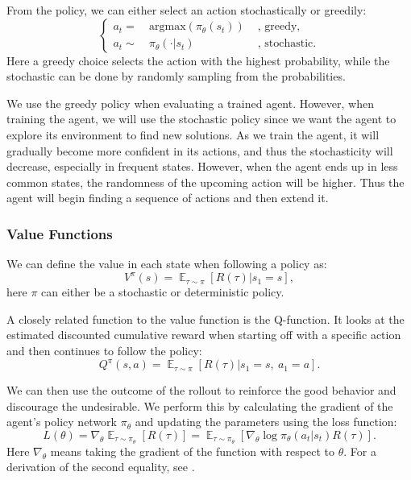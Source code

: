 \documentclass[12pt,A4]{report}
\theoremstyle{definition}
\begin{document}
From the policy, we can either select an action stochastically or greedily:
\begin{equation*}
  \left\{ 
  \begin{aligned}
    a_t =& \ \text{argmax}(\pi_\theta(s_t))& \text{ , greedy,} \\
    a_t \sim& \ \pi_\theta(\cdot | s_t)& \text{ , stochastic}.
  \end{aligned}
  \right.
\end{equation*}
Here a greedy choice selects the action with the highest probability, while the stochastic can be done by randomly sampling from the probabilities. 

We use the greedy policy when evaluating a trained agent. However,  when training the agent, we will use the stochastic policy since we want the agent to explore its environment to find new solutions. As we train the agent, it will gradually become more confident in its actions, and thus the stochasticity will decrease, especially in frequent states. However, when the agent ends up in less common states, the randomness of the upcoming action will be higher. Thus the agent will begin finding a sequence of actions and then extend it.
\subsubsection{Value Functions}

We can define the value in each state when following a policy as:
\[ V^\pi(s) = \mathop{\mathbb{E}}_{\tau \sim \pi} [R(\tau) | s_1 = s],\]
here $\pi$ can either be a stochastic or deterministic policy.

A closely related function to the value function is the Q-function. It looks at the estimated discounted cumulative reward when starting off with a specific action and then continues to follow the policy:
\[ Q^\pi(s, a) = \mathop{\mathbb{E}}_{\tau \sim \pi} [R(\tau) | s_1 = s, \ a_1 = a].\]

We can then use the outcome of the rollout to reinforce the good behavior and discourage the undesirable. We perform this by calculating the gradient of the agent's policy network $\pi_\theta$ and updating the parameters using the loss function:
\[ L(\theta) = \nabla_\theta \mathop{\mathbb{E}}_{\tau \sim \pi_\theta}[R(\tau)] = \mathop{\mathbb{E}}_{\tau \sim \pi_\theta} [\nabla_\theta \log \pi_\theta (a_t|s_t) R(\tau) ]. \]
Here $\nabla_\theta$ means taking the gradient of the function with respect to $\theta$. For a derivation of the second equality, see \citet{OpenAI}. 
\end{document}
